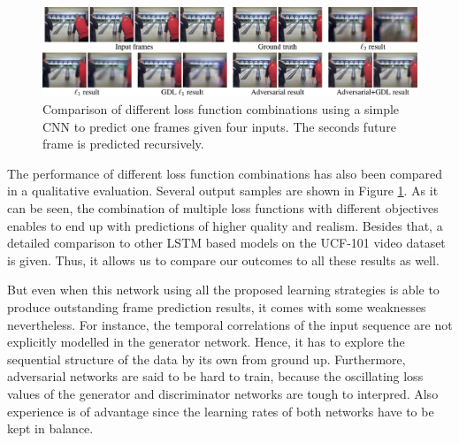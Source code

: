 \begin{figure}[htb]
	\centering
	\includegraphics[width=1.0\linewidth]{figures/related/deep_multiscale_samples.png} 
	\caption[Comparion of Loss Functions in GAN Model]{Comparison of different loss function combinations using a simple CNN to predict one frames given four inputs. The seconds future frame is predicted recursively.} \label{fig:gan_samples}
\end{figure}

The performance of different loss function combinations has also been compared in a qualitative evaluation. Several output samples are shown in Figure \ref{fig:gan_samples}. As it can be seen, the combination of multiple loss functions with different objectives enables to end up with predictions of higher quality and realism. Besides that, a detailed comparison to other LSTM based models on the UCF-101 video dataset is given. Thus, it allows us to compare our outcomes to all these results as well.

But even when this network using all the proposed learning strategies is able to produce outstanding frame prediction results, it comes with some weaknesses nevertheless. For instance, the temporal correlations of the input sequence are not explicitly modelled in the generator network. Hence, it has to explore the sequential structure of the data by its own from ground up. Furthermore, adversarial networks are said to be hard to train, because the oscillating loss values of the generator and discriminator networks are tough to interpred. Also experience is of advantage since the learning rates of both networks have to be kept in balance.
